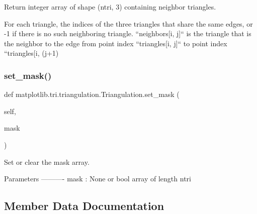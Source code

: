 \begin{DoxyVerb}Return integer array of shape (ntri, 3) containing neighbor triangles.

For each triangle, the indices of the three triangles that
share the same edges, or -1 if there is no such neighboring
triangle.  ``neighbors[i, j]`` is the triangle that is the neighbor
to the edge from point index ``triangles[i, j]`` to point index
``triangles[i, (j+1)%
\end{DoxyVerb}
 \mbox{\label{classmatplotlib_1_1tri_1_1triangulation_1_1Triangulation_a2d61b372e12b79b9880d4e219fda02af}} 
\subsubsection{\texorpdfstring{set\+\_\+mask()}{set\_mask()}}
{\footnotesize\ttfamily def matplotlib.\+tri.\+triangulation.\+Triangulation.\+set\+\_\+mask (\begin{DoxyParamCaption}\item[{}]{self,  }\item[{}]{mask }\end{DoxyParamCaption})}

\begin{DoxyVerb}Set or clear the mask array.

Parameters
----------
mask : None or bool array of length ntri
\end{DoxyVerb}
 

\subsection{Member Data Documentation}
\mbox{\label{classmatplotlib_1_1tri_1_1triangulation_1_1Triangulation_ae9ef3ea60fcc8f0ddad0fbb33440d824}} 
